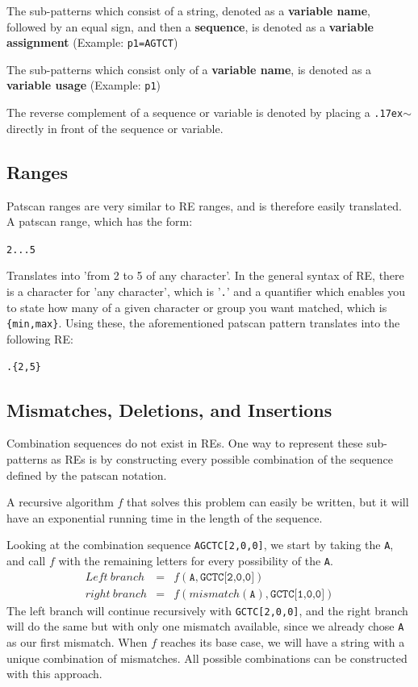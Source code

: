 \documentclass[12pt]{article}
\theoremstyle{definition}
\begin{document}
The sub-patterns which consist of a string, denoted as a \textbf{variable name}, followed by an equal sign, and then a \textbf{sequence}, is denoted as a \textbf{variable assignment} (Example: \texttt{p1=AGTCT})

The sub-patterns which consist only of a \textbf{variable name}, is denoted as a \textbf{variable usage} (Example: \texttt{p1})

The reverse complement of a sequence or variable is denoted by placing a \texttt{{\raise.17ex\hbox{$\scriptstyle\mathtt{\sim}$}}} directly in front of the sequence or variable.

\subsection{Ranges}

Patscan ranges are very similar to RE ranges, and is therefore easily translated. A patscan range, which has the form:
\begin{center}
	\texttt{2...5}
\end{center}
Translates into 'from 2 to 5 of any character'. In the general syntax of RE, there is a character for 'any character', which is '\texttt{.}' and a quantifier which enables you to state how many of a given character or group you want matched, which is \texttt{\{min,max\}}. Using these, the aforementioned patscan pattern translates into the following RE:
\begin{center}
\texttt{.\{2,5\}}
\end{center}

\subsection{Mismatches, Deletions, and Insertions}

Combination sequences do not exist in REs. One way to represent these sub-patterns as REs is by constructing every possible combination of the sequence defined by the patscan notation.

A recursive algorithm $f$ that solves this problem can easily be written, but it will have an exponential running time in the length of the sequence. 

\begin{example}[label=example:recursion]
Looking at the combination sequence \texttt{AGCTC[2,0,0]}, we start by taking the \texttt{A}, and call $f$ with the remaining letters for every possibility of the \texttt{A}.
\begin{eqnarray}
	Left\ branch &=& f(\texttt{A}, \texttt{GCTC[2,0,0]}) \\
	right\ branch &=& f(mismatch(\texttt{A}), \texttt{GCTC[1,0,0]})
\end{eqnarray}
The left branch will continue recursively with \texttt{GCTC[2,0,0]}, and the right branch will do the same but with only one mismatch available, since we already chose \texttt{A} as our first mismatch. When $f$ reaches its base case, we will have a string with a unique combination of mismatches. All possible combinations can be constructed with this approach.
\end{example}
\end{document}
